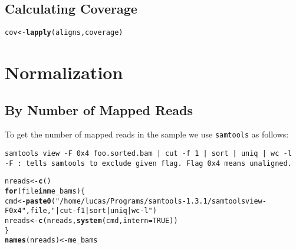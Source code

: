 \documentclass{article}\usepackage[]{graphicx}\usepackage[]{color}
\makeatletter
\newcommand{\hlnum}[1]{\textcolor[rgb]{0.686,0.059,0.569}{#1}}%
\newcommand{\hlstr}[1]{\textcolor[rgb]{0.192,0.494,0.8}{#1}}%
\newcommand{\hlstd}[1]{\textcolor[rgb]{0.345,0.345,0.345}{#1}}%
\newcommand{\hlkwa}[1]{\textcolor[rgb]{0.161,0.373,0.58}{\textbf{#1}}}%
\newcommand{\hlkwb}[1]{\textcolor[rgb]{0.69,0.353,0.396}{#1}}%
\newcommand{\hlkwc}[1]{\textcolor[rgb]{0.333,0.667,0.333}{#1}}%
\newcommand{\hlkwd}[1]{\textcolor[rgb]{0.737,0.353,0.396}{\textbf{#1}}}%
\newenvironment{kframe}{%
 \def\at@end@of@kframe{}%
 \ifinner\ifhmode%
  \def\at@end@of@kframe{\end{minipage}}%
  \begin{minipage}{\columnwidth}%
 \fi\fi%
 \def\FrameCommand##1{\hskip\@totalleftmargin \hskip-\fboxsep
 \colorbox{shadecolor}{##1}\hskip-\fboxsep
     \hskip-\linewidth \hskip-\@totalleftmargin \hskip\columnwidth}%
 \MakeFramed {\advance\hsize-\width
   \@totalleftmargin\z@ \linewidth\hsize
   \@setminipage}}%
 {\par\unskip\endMakeFramed%
 \at@end@of@kframe}
\newenvironment{knitrout}{}{} %
\makeatother
\begin{document}
\subsection{Calculating Coverage}
\begin{knitrout}
\color{fgcolor}\begin{kframe}
\begin{alltt}
\hlstd{cov} \hlkwb{<-} \hlkwd{lapply}\hlstd{(aligns, coverage)}
\end{alltt}
\end{kframe}
\end{knitrout}

\section{Normalization}%

\subsection{By Number of Mapped Reads} %

\noindent To get the number of mapped reads in the sample we use \texttt{samtools} as follows:

\begin{verbatim}
samtools view -F 0x4 foo.sorted.bam | cut -f 1 | sort | uniq | wc -l
-F : tells samtools to exclude given flag. Flag 0x4 means unaligned.
\end{verbatim}

\begin{knitrout}
\color{fgcolor}\begin{kframe}
\begin{alltt}
\hlstd{nreads} \hlkwb{<-} \hlkwd{c}\hlstd{()}
\hlkwa{for} \hlstd{(file} \hlkwa{in} \hlstd{me_bams) \{}
  \hlstd{cmd} \hlkwb{<-} \hlkwd{paste0}\hlstd{(}\hlstr{"/home/lucas/Programs/samtools-1.3.1/samtools view -F 0x4 "}\hlstd{, file,} \hlstr{" | cut -f 1 | sort | uniq | wc -l"}\hlstd{)}
  \hlstd{nreads} \hlkwb{<-} \hlkwd{c}\hlstd{(nreads,}\hlkwd{system}\hlstd{(cmd,} \hlkwc{intern} \hlstd{=} \hlnum{TRUE}\hlstd{))}
\hlstd{\}}
\hlkwd{names}\hlstd{(nreads)} \hlkwb{<-} \hlstd{me_bams}
\end{alltt}
\end{kframe}
\end{knitrout}
\end{document}
